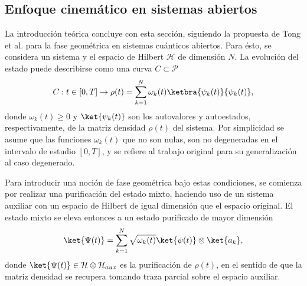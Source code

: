 \subsection{Enfoque cinemático en sistemas abiertos}
La introducción teórica concluye con esta sección, siguiendo la propuesta de Tong et al. \cite{Tong2004} para la fase geométrica en sistemas cuánticos abiertos. Para ésto, se considera un sistema y el espacio de Hilbert $\mathcal{H}$ de dimensión $N$. La evolución del estado puede describirse como una curva $C \subset \mathcal{P}$
\begin{equation}
    C:t\in[0,T] \rightarrow \rho(t) = \sum_{k=1}^N\omega_k(t)\ketbra{\psi_k(t)}{\psi_k(t)},
    \label{ec2:mapa rho}
\end{equation}
donde $\omega_k(t)\geq 0$ y $\ket{\psi_k(t)}$ son los autovalores y autoestados, respectivamente, de la matriz densidad $\rho(t)$ del sistema. Por simplicidad se asume que las funciones $\omega_k(t)$ que no son nulas, son no degeneradas en el intervalo de estudio $[0,T]$, y se refiere al trabajo original \cite{Tong2004} para su generalización al caso degenerado.

Para introducir una noción de fase geométrica bajo estas condiciones, se comienza por realizar una purificación del estado mixto, haciendo uso de un sistema auxiliar con un espacio de Hilbert de igual dimensión que el espacio original. El estado mixto se eleva entonces a un estado purificado de mayor dimensión
\begin{equation}
    \ket{\Psi(t)}=\sum_{k=1}^N\sqrt{\omega_k(t)}\ket{\psi(t)}\otimes\ket{a_k},
\end{equation}
donde $\ket{\Psi(t)}\in \mathcal{H}\otimes\mathcal{H}_{aux}$ es la purificación de $\rho(t)$, en el sentido de que la matriz densidad se recupera tomando traza parcial sobre el espacio auxiliar. 

